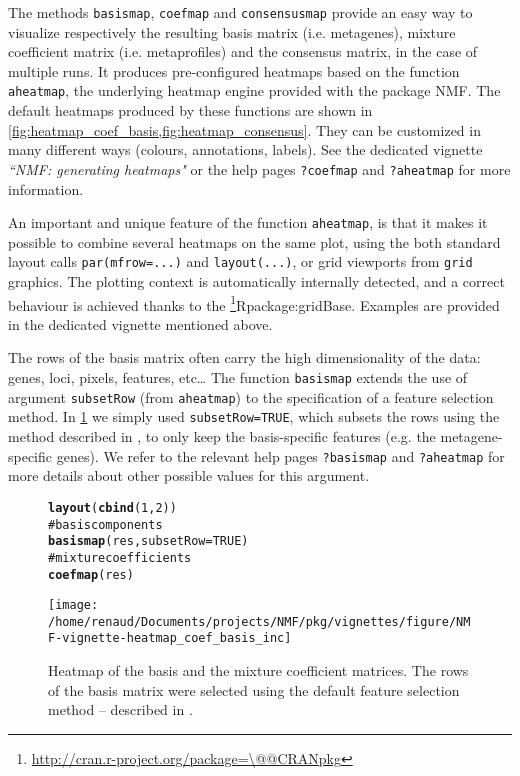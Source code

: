 \documentclass[a4paper]{article}\usepackage{graphicx, color}
\makeatletter
\def\maxwidth{ %
  \ifdim\Gin@nat@width>\linewidth
    \linewidth
  \else
    \Gin@nat@width
  \fi
}
\newcommand{\hlfunctioncall}[1]{\textcolor[rgb]{0.501960784313725,0,0.329411764705882}{\textbf{#1}}}%
\newcommand{\hlcomment}[1]{\textcolor[rgb]{0.180392156862745,0.6,0.341176470588235}{#1}}%
\newenvironment{kframe}{%
 \def\at@end@of@kframe{}%
 \ifinner\ifhmode%
  \def\at@end@of@kframe{\end{minipage}}%
  \begin{minipage}{\columnwidth}%
 \fi\fi%
 \def\FrameCommand##1{\hskip\@totalleftmargin \hskip-\fboxsep
 \colorbox{shadecolor}{##1}\hskip-\fboxsep
     \hskip-\linewidth \hskip-\@totalleftmargin \hskip\columnwidth}%
 \MakeFramed {\advance\hsize-\width
   \@totalleftmargin\z@ \linewidth\hsize
   \@setminipage}}%
 {\par\unskip\endMakeFramed%
 \at@end@of@kframe}
\newenvironment{knitrout}{}{} %
\let\code=\texttt
\newcommand{\pkgname}[1]{\textit{#1}\xspace}
\newcommand{\CRANurl}[1]{\url{http://cran.r-project.org/package=#1}}
\def\CRANpkg{\@ifstar\@CRANpkg\@@CRANpkg}
\def\@CRANpkg#1{\href{http://cran.r-project.org/package=#1}{\pkgname{#1}}\footnote{\CRANurl{#1}}}
\def\@@CRANpkg#1{\href{http://cran.r-project.org/package=#1}{\pkgname{#1}} package\footnote{\CRANurl{#1}}}
\def\citeCRANpkg{\@ifstar\@citeCRANpkg\@@citeCRANpkg}
\def\@citeCRANpkg#1{\CRANpkg{#1}\cite*{Rpackage:#1}}
\def\@@citeCRANpkg#1{\CRANpkg{#1}~\cite{Rpackage:#1}}
\renewcommand{\cite}[1]{\parencite{#1}}
\makeatother
\begin{document}
The methods \code{basismap}, \code{coefmap} and \code{consensusmap} provide an
easy way to visualize respectively the resulting basis matrix (i.e. metagenes),
mixture coefficient matrix (i.e. metaprofiles) and the consensus matrix, in the
case of multiple runs.
It produces pre-configured heatmaps based on the function \code{aheatmap}, the
underlying heatmap engine provided with the package NMF. 
The default heatmaps produced by these functions are shown in
\cref{fig:heatmap_coef_basis,fig:heatmap_consensus}.
They can be customized in many different ways (colours, annotations, labels).
See the dedicated vignette \emph{``NMF: generating heatmaps"} or the help pages
\code{?coefmap} and \code{?aheatmap} for more information.

An important and unique feature of the function \code{aheatmap}, is that it
makes it possible to combine several heatmaps on the same plot, using the both
standard layout calls \texttt{par(mfrow=...)} and \texttt{layout(...)}, or grid
viewports from \texttt{grid} graphics.
The plotting context is automatically internally detected, and a correct
behaviour is achieved thanks to the \citeCRANpkg{gridBase}.
Examples are provided in the dedicated vignette mentioned above.

The rows of the basis matrix often carry the high dimensionality of the data: genes, loci, pixels, features, etc\ldots 
The function \code{basismap} extends the use of argument \code{subsetRow} (from \code{aheatmap}) to the specification of a feature selection method.
In \cref{fig:heatmap_coef_basis} we simply used \code{subsetRow=TRUE}, which subsets the rows using the method described in \cite{KimH2007}, to only keep the basis-specific features (e.g. the metagene-specific genes). 
We refer to the relevant help pages \code{?basismap} and \code{?aheatmap} for more details about other possible values for this argument.

\begin{figure}[!htbp]
\centering
\begin{knitrout}
\color{fgcolor}\begin{kframe}
\begin{alltt}
\hlfunctioncall{layout}(\hlfunctioncall{cbind}(1, 2))
\hlcomment{# basis components}
\hlfunctioncall{basismap}(res, subsetRow = TRUE)
\hlcomment{# mixture coefficients}
\hlfunctioncall{coefmap}(res)
\end{alltt}
\end{kframe}\texttt{[image: /home/renaud/Documents/projects/NMF/pkg/vignettes/figure/NMF-vignette-heatmap\_coef\_basis\_inc]} 
\end{knitrout}

\caption{Heatmap of the basis and the mixture coefficient matrices. The rows of the basis matrix were selected using the default feature selection method -- described in \cite{KimH2007}.}
\label{fig:heatmap_coef_basis}
\end{figure}
\end{document}
